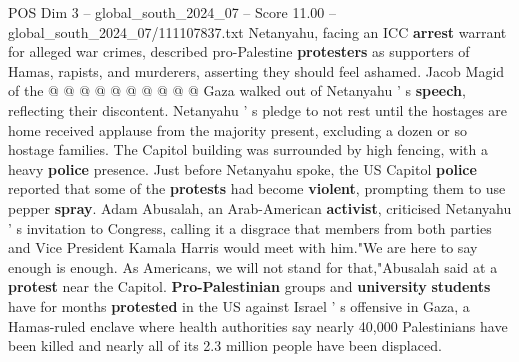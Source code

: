 \begin{textsample}{POS Dim 3 – global\_south\_2024\_07 – Score 11.00 – global\_south\_2024\_07/111107837.txt}
Netanyahu, facing an ICC \textbf{arrest} warrant for alleged war crimes, described pro-Palestine \textbf{protesters} as supporters of Hamas, rapists, and murderers, asserting they should feel ashamed.
Jacob Magid of the @ @ @ @ @ @ @ @ @ @ Gaza walked out of Netanyahu ' s \textbf{speech}, reflecting their discontent.
Netanyahu ' s pledge to not rest until the hostages are home received applause from the majority present, excluding a dozen or so hostage families.
The Capitol building was surrounded by high fencing, with a heavy \textbf{police} presence.
Just before Netanyahu spoke, the US Capitol \textbf{police} reported that some of the \textbf{protests} had become \textbf{violent}, prompting them to use pepper \textbf{spray}.
Adam Abusalah, an Arab-American \textbf{activist}, criticised Netanyahu ' s invitation to Congress, calling it a disgrace that members from both parties and Vice President Kamala Harris would meet with him."We are here to say enough is enough.
As Americans, we will not stand for that,"Abusalah said at a \textbf{protest} near the Capitol. \textbf{Pro-Palestinian} groups and \textbf{university} \textbf{students} have for months \textbf{protested} in the US against Israel ' s offensive in Gaza, a Hamas-ruled enclave where health authorities say nearly 40,000 Palestinians have been killed and nearly all of its 2.3 million people have been displaced.

\end{textsample}
